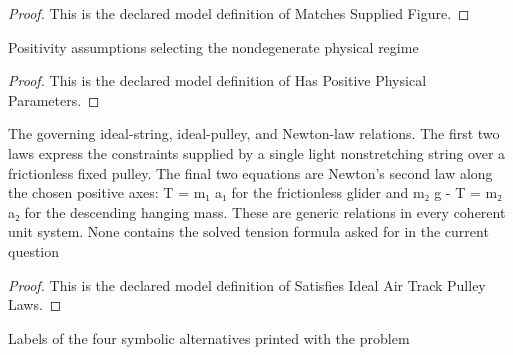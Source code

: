 \begin{proof}
  This is the declared model definition of Matches Supplied Figure.
\end{proof}
\begin{definition}
  \label{def:physics:phyx-mini-0805:phyxminiproblems-problemphyxmini0805-haspositivephysicalparameters}
  Positivity assumptions selecting the nondegenerate physical regime
\end{definition}
\begin{proof}
  This is the declared model definition of Has Positive Physical Parameters.
\end{proof}
\begin{definition}
  \label{def:physics:phyx-mini-0805:phyxminiproblems-problemphyxmini0805-satisfiesidealairtrackpulleylaws}
  The governing ideal-string, ideal-pulley, and Newton-law relations. The first two laws express the constraints supplied by a single light nonstretching string over a frictionless fixed pulley. The final two equations are Newton's second law along the chosen positive axes: T = m₁ a₁ for the frictionless glider and m₂ g - T = m₂ a₂ for the descending hanging mass. These are generic relations in every coherent unit system. None contains the solved tension formula asked for in the current question
\end{definition}
\begin{proof}
  This is the declared model definition of Satisfies Ideal Air Track Pulley Laws.
\end{proof}
\begin{definition}
  \label{def:physics:phyx-mini-0805:phyxminiproblems-problemphyxmini0805-answerchoice}
  Labels of the four symbolic alternatives printed with the problem
\end{definition}
